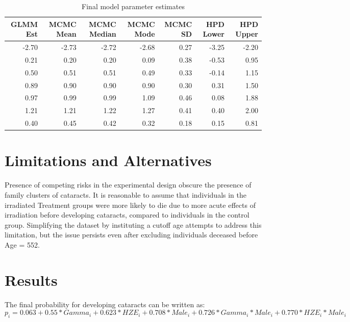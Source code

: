 \documentclass[12pt]{article}
\begin{document}
\begin{table}
\centering
\begin{tabular}{rrrrrrr}
  \toprule
GLMM Est & MCMC Mean & MCMC Median & MCMC Mode & MCMC SD & HPD Lower & HPD Upper \\ 
  \midrule
-2.70 & -2.73 & -2.72 & -2.68 & 0.27 & -3.25 & -2.20 \\ 
  0.21 & 0.20 & 0.20 & 0.09 & 0.38 & -0.53 & 0.95 \\ 
  0.50 & 0.51 & 0.51 & 0.49 & 0.33 & -0.14 & 1.15 \\ 
  0.89 & 0.90 & 0.90 & 0.90 & 0.30 & 0.31 & 1.50 \\ 
  0.97 & 0.99 & 0.99 & 1.09 & 0.46 & 0.08 & 1.88 \\ 
  1.21 & 1.21 & 1.22 & 1.27 & 0.41 & 0.40 & 2.00 \\ 
  0.40 & 0.45 & 0.42 & 0.32 & 0.18 & 0.15 & 0.81 \\ 
   \bottomrule
\end{tabular}
\caption{Final model parameter estimates} 
\end{table}

\section{Limitations and Alternatives}
\label{sec:limits}

Presence of competing risks in the experimental design obscure the presence of family clusters of cataracts. It is reasonable to assume that individuals in the irradiated Treatment groups were more likely to die due to more acute effects of irradiation before developing cataracts, compared to individuals in the control group. Simplifying the dataset by instituting a cutoff age attempts to address this limitation, but the issue persists even after excluding individuals deceased before Age = 552.

\section{Results}
\label{sec:results}

The final probability for developing cataracts can be written as:\\
\begin{equation}
p_i = 0.063 + 0.55*Gamma_i + 0.623*HZE_i + 0.708*Male_i + 0.726*Gamma_i*Male_i + 0.770*HZE_i*Male_i
\label{eq:probs}
\end{equation}
\end{document}
